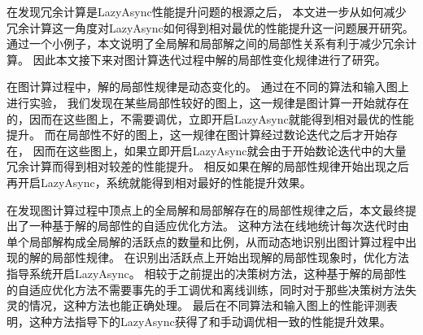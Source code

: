 在发现冗余计算是LazyAsync性能提升问题的根源之后，
本文进一步从如何减少冗余计算这一角度对LazyAsync如何得到相对最优的性能提升这一问题展开研究。
通过一个小例子，本文说明了全局解和局部解之间的局部性关系有利于减少冗余计算。
因此本文接下来对图计算迭代过程中解的局部性变化规律进行了研究。



在图计算过程中，解的局部性规律是动态变化的。
通过在不同的算法和输入图上进行实验，
我们发现在某些局部性较好的图上，这一规律是图计算一开始就存在的，因而在这些图上，不需要调优，立即开启LazyAsync就能得到相对最优的性能提升。
而在局部性不好的图上，这一规律在图计算经过数论迭代之后才开始存在，
因而在这些图上，如果立即开启LazyAsync就会由于开始数论迭代中的大量冗余计算而得到相对较差的性能提升。
相反如果在解的局部性规律开始出现之后再开启LazyAsync，系统就能得到相对最好的性能提升效果。


在发现图计算过程中顶点上的全局解和局部解存在的局部性规律之后，本文最终提出了一种基于解的局部性的自适应优化方法。
这种方法在线地统计每次迭代时由单个局部解构成全局解的活跃点的数量和比例，从而动态地识别出图计算过程中出现的解的局部性规律。
在识别出活跃点上开始出现解的局部性现象时，优化方法指导系统开启LazyAsync。
相较于之前提出的决策树方法，这种基于解的局部性的自适应优化方法不需要事先的手工调优和离线训练，同时对于那些决策树方法失灵的情况，这种方法也能正确处理。
最后在不同算法和输入图上的性能评测表明，这种方法指导下的LazyAsync获得了和手动调优相一致的性能提升效果。

